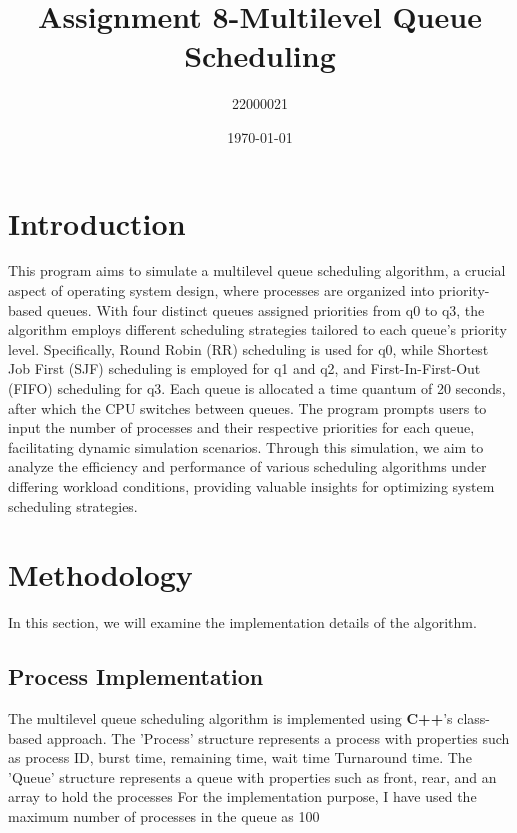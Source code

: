 \documentclass{article}
\title{\Huge Assignment 8-Multilevel Queue Scheduling}
\author{22000021}
\date{\today}
\begin{document}
\maketitle
\newpage

\section{Introduction}
This program aims to simulate a multilevel queue scheduling algorithm, a crucial aspect of operating system design, where processes are organized into priority-based queues. With four distinct queues assigned priorities from q0 to q3, the algorithm employs different scheduling strategies tailored to each queue's priority level. Specifically, Round Robin (RR) scheduling is used for q0, while Shortest Job First (SJF) scheduling is employed for q1 and q2, and First-In-First-Out (FIFO) scheduling for q3. Each queue is allocated a time quantum of 20 seconds, after which the CPU switches between queues. The program prompts users to input the number of processes and their respective priorities for each queue, facilitating dynamic simulation scenarios. Through this simulation, we aim to analyze the efficiency and performance of various scheduling algorithms under differing workload conditions, providing valuable insights for optimizing system scheduling strategies.


\section{Methodology}
\vspace{\baselineskip}
In this section, we will examine the implementation details of the algorithm.

\subsection{Process Implementation}
\vspace{\baselineskip}
The multilevel queue scheduling algorithm is implemented using \textbf{C++}’s class-based approach.
The ’Process’ structure represents a process with properties such as process ID, burst time, remaining time, wait time Turnaround time. 
The ’Queue’ structure represents a queue with properties such as front, rear, and an array to hold the processes
For the implementation purpose, I have used the maximum number of processes in the queue as 100
\end{document}
